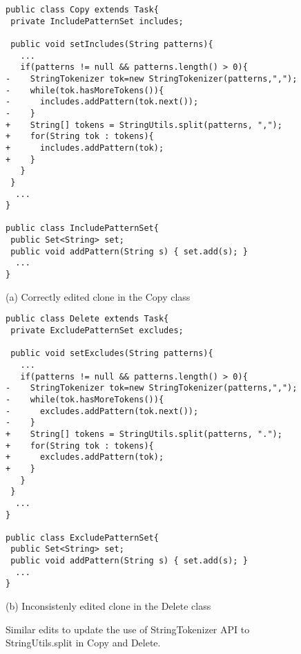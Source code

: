 \begin{figure*}[!ht]
\begin{minipage}[t]{0.49\linewidth}
\begin{lstlisting}[style=MyJavaSmallStyle]
public class Copy extends Task{
 private IncludePatternSet includes;

 public void setIncludes(String patterns){
   ...
   if(patterns != null && patterns.length() > 0){
-    StringTokenizer tok=new StringTokenizer(patterns,",");
-    while(tok.hasMoreTokens()){
-      includes.addPattern(tok.next());
-    }
+    String[] tokens = StringUtils.split(patterns, ",");
+    for(String tok : tokens){
+      includes.addPattern(tok);
+    }
   }
 }
  ...
}

public class IncludePatternSet{
 public Set<String> set;
 public void addPattern(String s) { set.add(s); }
  ...
}

\end{lstlisting}
\vspace{-2mm}
\begin{center}\begin{footnotesize}(a) Correctly edited clone in the Copy class\end{footnotesize}\end{center}
\end{minipage}
%
\begin{minipage}[t]{0.49\linewidth}
\begin{lstlisting}[style=MyJavaSmallStyle]
public class Delete extends Task{
 private ExcludePatternSet excludes;

 public void setExcludes(String patterns){
   ...
   if(patterns != null && patterns.length() > 0){
-    StringTokenizer tok=new StringTokenizer(patterns,",");
-    while(tok.hasMoreTokens()){
-      excludes.addPattern(tok.next());
-    }
+    String[] tokens = StringUtils.split(patterns, ".");
+    for(String tok : tokens){
+      excludes.addPattern(tok);
+    }
   }
 }
  ...
}

public class ExcludePatternSet{
 public Set<String> set;
 public void addPattern(String s) { set.add(s); }
  ...
}
\end{lstlisting}
\vspace{-2mm}
\begin{center}\begin{footnotesize}(b) Inconsistenly edited clone in the Delete class\end{footnotesize}\end{center}
\end{minipage}
\caption{Similar edits to update the use of {\ttt StringTokenizer} API to {\ttt StringUtils.split} in {\ttt Copy} and {\ttt Delete}.}%
\label{fig:example}
\vspace{-4mm}
\end{figure*}

